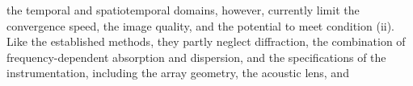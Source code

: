 the temporal
\cite{proc:SchiffnerIUS2013a,proc:SchiffnerIUS2013b,proc:SchiffnerIUS2012,article:SchiffnerBMT2012,proc:SchiffnerIUS2011} and
spatiotemporal
\cite{article:BessonITUFFC2016}  domains, however, currently limit
the convergence speed,
the image quality, and
the potential to meet
condition (ii).
Like
the established methods,
they partly neglect
diffraction,
the combination of
frequency-dependent absorption and
dispersion, and
the specifications of
the instrumentation, including
the array geometry,
the acoustic lens, and
